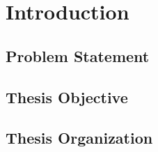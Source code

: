 \chapter{Introduction}
\label{chap:intro}

\section{Problem Statement}

\section{Thesis Objective}

\section{Thesis Organization}
